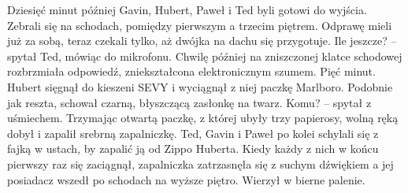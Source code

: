 \documentclass[../MAIN.tex]{subfiles}
\begin{document}
Dziesięć minut później Gavin, Hubert, Paweł i Ted byli gotowi do wyjścia. Zebrali się na schodach, pomiędzy pierwszym a trzecim piętrem. Odprawę mieli już za sobą, teraz czekali tylko, aż dwójka na dachu się przygotuje.
\sx Ile jeszcze? -- spytał Ted, mówiąc do mikrofonu. Chwilę później na zniszczonej klatce schodowej rozbrzmiała odpowiedź, zniekształcona elektronicznym szumem.
\xx Pięć minut.
\qd
Hubert sięgnął do kieszeni SEVY i wyciągnął z niej paczkę Marlboro. Podobnie jak reszta, schował czarną, błyszczącą zasłonkę na twarz.
\sx Komu? -- spytał z uśmiechem.
\qd
Trzymając otwartą paczkę, z której ubyły trzy papierosy, wolną ręką dobył i zapalił srebrną zapalniczkę. Ted, Gavin i Paweł po kolei schylali się z fajką w ustach, by zapalić ją od Zippo Huberta. Kiedy każdy z nich w końcu pierwszy raz się zaciągnął, zapalniczka zatrzasnęła się z suchym dźwiękiem a jej posiadacz wszedł po schodach na wyższe piętro. Wierzył w bierne palenie.
\end{document}
